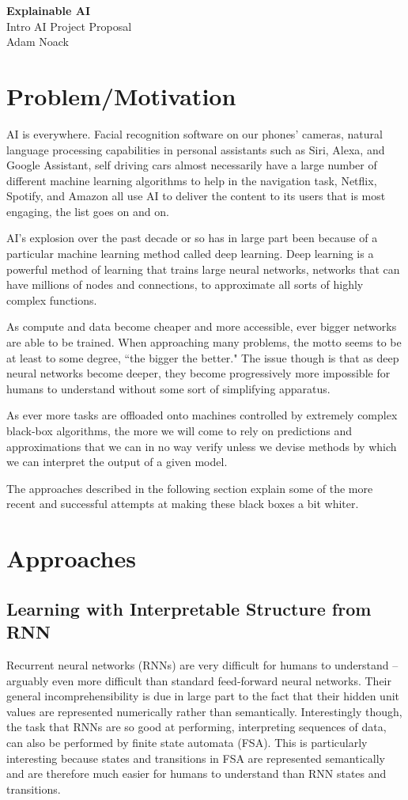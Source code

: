 \documentclass[12pt, letterpaper]{article}
\begin{document}
\begin{center}
\Large{\textbf{Explainable AI}}	\\
\large{Intro AI Project Proposal}\\
\large{Adam Noack}
\end{center}
\section{Problem/Motivation}
\par AI is everywhere. Facial recognition software on our phones' cameras, natural language processing capabilities in personal assistants such as Siri, Alexa, and Google Assistant, self driving cars almost necessarily have a large number of different machine learning algorithms to help in the navigation task, Netflix, Spotify, and Amazon all use AI to deliver the content to its users that is most engaging, the list goes on and on.
\par AI's explosion over the past decade or so has in large part been because of a particular machine learning method called deep learning. Deep learning is a powerful method of learning that trains large neural networks, networks that can have millions of nodes and connections, to approximate all sorts of highly complex functions. 
\par As compute and data become cheaper and more accessible, ever bigger networks are able to be trained. When approaching many problems, the motto seems to be at least to some degree, ``the bigger the better." The issue though is that as deep neural networks become deeper, they become progressively more impossible for humans to understand without some sort of simplifying apparatus. 
\par As ever more tasks are offloaded onto machines controlled by extremely complex black-box algorithms, the more we will come to rely on predictions and approximations that we can in no way verify unless we devise methods by which we can interpret the output of a given model.
\par The approaches described in the following section explain some of the more recent and successful attempts at making these black boxes a bit whiter.
\section{Approaches}

\subsection{Learning with Interpretable Structure from RNN}
Recurrent neural networks (RNNs) are very difficult for humans to understand -- arguably even more difficult than standard feed-forward neural networks. Their general incomprehensibility is due in large part to the fact that their hidden unit values are represented numerically rather than semantically. Interestingly though, the task that RNNs are so good at performing, interpreting sequences of data, can also be performed by finite state automata (FSA). This is particularly interesting because states and transitions in FSA are represented semantically and are therefore much easier for humans to understand than RNN states and transitions.
\end{document}
